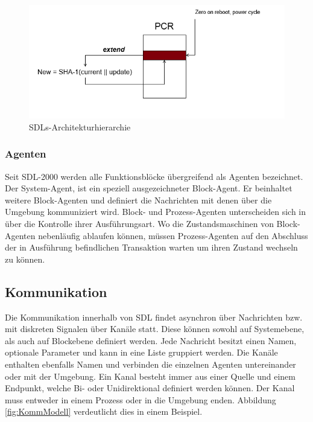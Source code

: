 \begin{figure}[ht]
	\centering
	\includegraphics[width=1\textwidth]{test.png}
	\caption{SDLs-Architekturhierarchie}
	\label{fig:ArchModell}
\end{figure}

\subsubsection{Agenten}
Seit \ac{SDL}-2000 werden alle Funktionsblöcke übergreifend als Agenten bezeichnet. Der System-Agent, ist ein speziell ausgezeichneter Block-Agent. Er beinhaltet weitere Block-Agenten und definiert die Nachrichten mit denen über die Umgebung kommuniziert wird. Block- und Prozess-Agenten unterscheiden sich in über die Kontrolle ihrer Ausführungsart. Wo die Zustandsmaschinen von Block-Agenten nebenläufig ablaufen können, müssen Prozess-Agenten auf den Abschluss der in Ausführung befindlichen Transaktion warten um ihren Zustand wechseln zu können.


\subsection{Kommunikation}
\label{ssc:Kommunikation}
Die Kommunikation innerhalb von \ac{SDL} findet asynchron über Nachrichten bzw. mit diskreten Signalen über Kanäle statt. 
Diese können sowohl auf Systemebene, als auch auf Blockebene definiert werden.
Jede Nachricht besitzt einen Namen, optionale Parameter und kann in eine Liste gruppiert werden. 
Die Kanäle enthalten ebenfalls Namen und verbinden die einzelnen Agenten untereinander oder mit der Umgebung.
Ein Kanal besteht immer aus einer Quelle und einem Endpunkt, welche Bi- oder Unidirektional definiert werden können. Der Kanal muss entweder in einem Prozess oder in die Umgebung enden.
Abbildung \ref{fig:KommModell} verdeutlicht dies in einem Beispiel.
 
